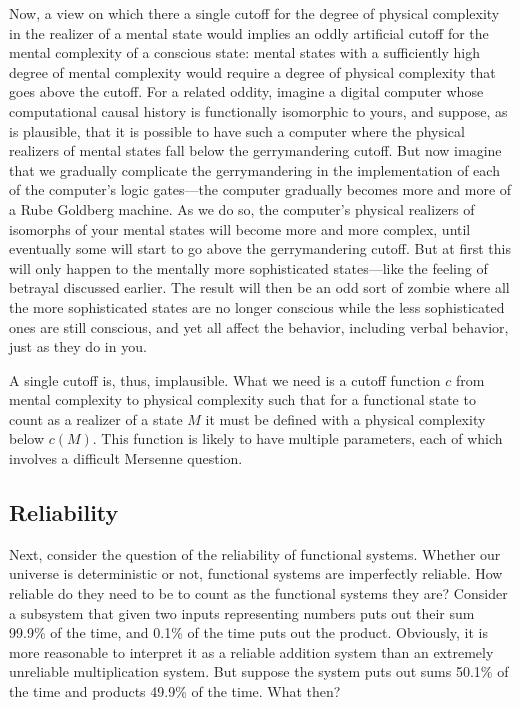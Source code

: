 Now, a view on which there a single cutoff for the degree of physical complexity in the realizer of a 
mental state would implies an oddly artificial cutoff for the mental complexity of a conscious state: 
mental states with a sufficiently high degree of mental complexity would require a degree of physical 
complexity that goes above the cutoff. For a related oddity, imagine a digital computer whose computational
causal history is functionally isomorphic to yours, and suppose, as is plausible, that it is possible to 
have such a computer where the physical realizers of mental states fall below the gerrymandering cutoff.
But now imagine that we gradually complicate the gerrymandering in the implementation of each of the 
computer's logic gates---the computer gradually becomes more and more of a Rube Goldberg machine. 
As we do so, the computer's physical realizers of isomorphs of your mental states will become more and more
complex, until eventually some will start to go above the gerrymandering cutoff. But at first this will only
happen to the mentally more sophisticated states---like the feeling of betrayal discussed earlier. The result will then be an odd sort of zombie where all the more sophisticated states are no longer conscious while the less sophisticated 
ones are still conscious, and yet all affect the behavior, including verbal behavior, just as they do in you.

A single cutoff is, thus, implausible. What we need is a cutoff function $c$ from mental complexity to physical
complexity such that for a functional state to count as a realizer of a state $M$ it must be defined with a 
physical complexity below $c(M)$. This function is likely to have multiple parameters, each of which involves
a difficult Mersenne question. 

\subsection{Reliability}
Next, consider the question of the reliability of functional systems. Whether our universe is deterministic or not, functional systems are imperfectly reliable.
How reliable do they need to be to count as the functional systems they are? Consider a subsystem that given two inputs representing numbers
puts out their sum 99.9\% of the time, and 0.1\% of the time puts out the product. Obviously, it is more reasonable to interpret it as 
a reliable addition system than an extremely unreliable multiplication system. But suppose the system puts out sums 50.1\% of the time
and products 49.9\% of the time. What then? 


